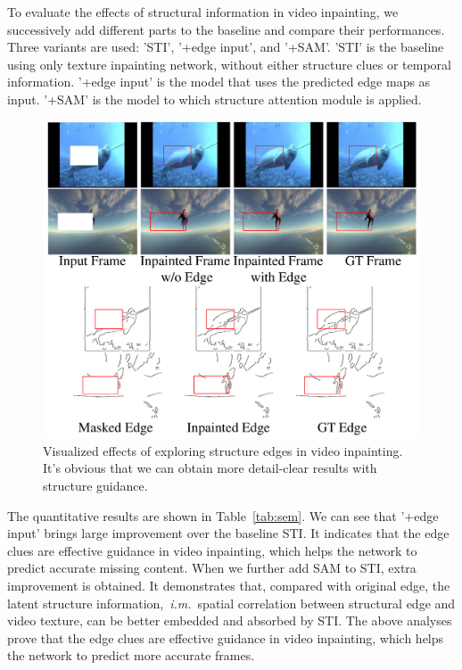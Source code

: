 To evaluate the effects of structural information in video inpainting, we successively add different parts to the baseline and compare their performances. Three variants are used: 'STI', '+edge input', and '+SAM'. 
'STI' is the baseline using only texture inpainting network, without either structure clues or temporal information. '+edge input' is the model that uses the predicted edge maps as input. '+SAM' is the model to which structure attention module is applied.
\begin{figure}[!ht]
	\centering
	\includegraphics[width=0.97\columnwidth]{edgevis} %
	\caption{Visualized effects of exploring structure edges in video inpainting. It's obvious that we can obtain more detail-clear results with structure guidance.}
	\label{edgevis}
\end{figure}
The quantitative results are shown in Table~\ref{tab:sem}. 
We can see that '+edge input' brings large improvement over the baseline STI.
It indicates that the edge clues are effective guidance in video inpainting, which helps the network to predict accurate missing content.
When we further add SAM to STI, extra improvement is obtained.
It demonstrates that, compared with original edge, the latent structure information,~\emph{i.m.}~spatial correlation between structural edge and video texture, can be better embedded and absorbed by STI.
The above analyses prove that the edge clues are effective guidance in video inpainting, which helps the network to predict more accurate frames.

